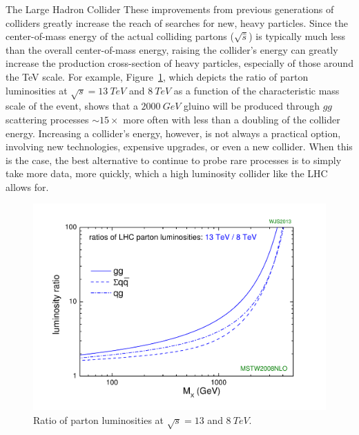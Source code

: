 \begin{section}{The Large Hadron Collider}
These improvements from previous generations of colliders greatly increase the reach of searches for new, heavy particles.
Since the center-of-mass energy of the actual colliding partons ($\sqrt{\hat{s}}$) is typically much less than the overall center-of-mass energy, raising the collider's energy can greatly increase the production cross-section of heavy particles, especially of those around the TeV scale. 
For example, Figure~\ref{fig:parton_lumi}, which depicts the ratio of parton luminosities at $\sqrt{s} = 13~TeV$ and $8~TeV$ as a function of the characteristic mass scale of the event, shows that a $2000~GeV$ gluino will be produced through $gg$ scattering processes ${\sim}15\times$ more often with less than a doubling of the collider energy.
Increasing a collider's energy, however, is not always a practical option, involving new technologies, expensive upgrades, or even a new collider. When this is the case, the best alternative to continue to probe rare processes is to simply take more data, more quickly, which a high luminosity collider like the LHC allows for.


\begin{figure}[tbp!]
\begin{center}
\includegraphics[angle=0,width=0.80\columnwidth]{fig/parton_lumi.pdf}
\end{center}
\caption{Ratio of parton luminosities at $\sqrt{s} = 13$ and $8~TeV$.}
\label{fig:parton_lumi}
\end{figure}


\end{section}

